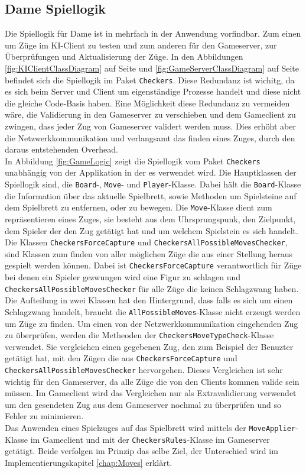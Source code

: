 \documentclass[12pt,a4paper,bibliography=totocnumbered,listof=totocnumbered]{article}
\begin{document}
\subsection{Dame Spiellogik}
\label{chap:Spiellogik}
Die Spiellogik für Dame ist in mehrfach in der Anwendung vorfindbar. Zum einen um Züge im KI-Client zu testen und zum anderen
für den Gameserver, zur Überprüfungen und Aktualisierung der Züge. In den Abbildungen \ref{fig:KIClientClassDiagram} auf Seite \pageref{fig:KIClientClassDiagram} 
und \ref{fig:GameServerClassDiagram} auf Seite \pageref{fig:GameServerClassDiagram}
befindet sich die Spiellogik im Paket \texttt{Checkers}. Diese Redundanz ist wichitg, da es sich beim Server und Client um eigenständige Prozesse handelt 
und diese nicht die gleiche Code-Basis haben. Eine Möglichkeit diese Redundanz zu vermeiden wäre, die Validierung in den Gameserver zu verschieben und 
dem Gameclient zu zwingen, dass jeder Zug von Gameserver validert werden muss. Dies erhöht aber die Netzwerkkommunikation und verlangsamt das finden eines Zuges, 
durch den daraus entstehenden Overhead.
\\
In Abbildung \ref{fig:GameLogic} zeigt die Spiellogik vom Paket \texttt{Checkers} unabhängig von der Applikation in der es verwendet wird.
Die Hauptklassen der Spiellogik sind, die \texttt{Board}-, \texttt{Move}- und \texttt{Player}-Klasse. Dabei hält die \texttt{Board}-Klasse die Information über das aktuelle Spielbrett, sowie 
Methoden um Spielsteine auf dem Spielbrett zu entfernen, oder zu bewegen. Die \texttt{Move}-Klasse dient zum repräsentieren eines Zuges, sie besteht aus dem 
Uhrsprungspunk, den Zielpunkt, dem Spieler der den Zug getätigt hat und um welchem Spielstein es sich handelt. 
\\
Die Klassen \texttt{CheckersForceCapture} und \texttt{CheckersAllPossibleMovesChecker}, sind Klassen zum finden von aller möglichen Züge die aus einer Stellung heraus gespielt werden
können. Dabei ist \texttt{CheckersForceCapture} verantwortlich für Züge bei denen ein Spieler gezwungen wird eine Figur zu schlagen und \texttt{CheckersAllPossibleMovesChecker} 
für alle Züge die keinen Schlagzwang haben. Die Aufteilung in zwei Klassen hat den Hintergrund, dass falls es sich um einen Schlagzwang handelt, braucht 
die \texttt{AllPossibleMoves}-Klasse nicht erzeugt werden um Züge zu finden. Um einen von der Netzwerkkommunikation eingehenden Zug zu überprüfen, 
werden die Metheoden der \texttt{CheckersMoveTypeCheck}-Klasse verwendet. Sie vergleichen einen gegebenen Zug, 
den zum Beispiel der Benuzter getätigt hat, mit den Zügen die aus \texttt{CheckersForceCapture} und \texttt{CheckersAllPossibleMovesChecker}
hervorgehen. Dieses Vergleichen ist sehr wichtig für den Gameserver, da alle Züge die von den Clients kommen valide sein müssen. Im Gameclient wird das Vergleichen nur 
als Extravalidierung verwendet um den gesendeten Zug aus dem Gameserver nochmal zu überprüfen und so Fehler zu minimieren.
\\
Das Anwenden eines Spielzuges auf das Spielbrett wird mittels der \texttt{MoveApplier}-Klasse im Gameclient und mit der \texttt{CheckersRules}-Klasse im Gameserver 
getätigt. Beide verfolgen im Prinzip das selbe Ziel, der Unterschied wird im Implementierungskapitel \ref{chap:Moves} erklärt.
\end{document}
